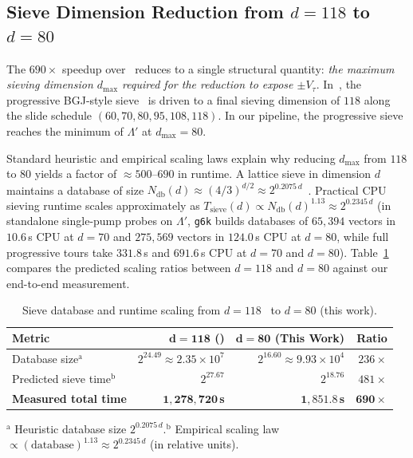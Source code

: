 \documentclass[11pt,a4paper]{article}
\theoremstyle{definition}
\newcommand{\Lp}{\Lambda'}
\newcommand{\Vt}{V_\tau}
\begin{document}
\subsection{Sieve Dimension Reduction from \texorpdfstring{$d=118$}{d=118} to \texorpdfstring{$d=80$}{d=80}}
The $690\times$ speedup over~\cite{SW26} reduces to a single structural quantity: \emph{the maximum sieving dimension $d_{\max}$ required for the reduction to expose $\pm\Vt$}. In~\cite{SW26}, the progressive BGJ-style sieve~\cite{ZDY25} is driven to a final sieving dimension of $118$ along the slide schedule $(60, 70, 80, 95, 108, 118)$. In our pipeline, the progressive sieve reaches the minimum of $\Lp$ at $d_{\max} = 80$.

Standard heuristic and empirical scaling laws explain why reducing $d_{\max}$ from $118$ to $80$ yields a factor of $\approx 500\text{--}690$ in runtime. A lattice sieve in dimension $d$ maintains a database of size $N_{\mathrm{db}}(d) \approx (4/3)^{d/2} \approx 2^{0.2075\,d}$~\cite{BDGL16,ADH+19}. Practical CPU sieving runtime scales approximately as $T_{\mathrm{sieve}}(d) \propto N_{\mathrm{db}}(d)^{1.13} \approx 2^{0.2345\,d}$ (in standalone single-pump probes on $\Lp$, \texttt{g6k} builds databases of $65{,}394$ vectors in $10.6$\,s CPU at $d=70$ and $275{,}569$ vectors in $124.0$\,s CPU at $d=80$, while full progressive tours take $331.8$\,s and $691.6$\,s CPU at $d=70$ and $d=80$). Table~\ref{tab:sieve-scaling} compares the predicted scaling ratios between $d=118$ and $d=80$ against our end-to-end measurement.

\begin{table}[t]
\centering
\small
\caption{Sieve database and runtime scaling from $d=118$~\cite{SW26} to $d=80$ (this work).}
\label{tab:sieve-scaling}
\begin{tabular}{@{}lrrr@{}}
\toprule
\textbf{Metric} & $\boldsymbol{d = 118}$ \textbf{(\cite{SW26})} & $\boldsymbol{d = 80}$ \textbf{(This Work)} & \textbf{Ratio} \\
\midrule
Database size$^{\mathrm{a}}$ & $2^{24.49} \approx 2.35 \times 10^7$ & $2^{16.60} \approx 9.93 \times 10^4$ & $236\times$ \\
Predicted sieve time$^{\mathrm{b}}$ & $2^{27.67}$ & $2^{18.76}$ & $481\times$ \\
\midrule
\textbf{Measured total time} & $\mathbf{1{,}278{,}720}$\,\textbf{s} & $\mathbf{1{,}851.8}$\,\textbf{s} & $\mathbf{690\times}$ \\
\bottomrule
\end{tabular}
\par\smallskip
{\scriptsize $^{\mathrm{a}}$ Heuristic database size $2^{0.2075\,d}$.\quad $^{\mathrm{b}}$ Empirical scaling law $\propto (\text{database})^{1.13} \approx 2^{0.2345\,d}$ (in relative units).}
\end{table}
\end{document}
